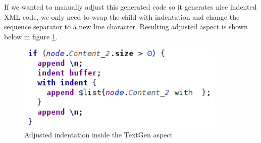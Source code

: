 If we wanted to manually adjust this generated code so it generates nice indented XML code, we only need to wrap the  child with indentation and change the sequence separator to a new line character. Resulting adjusted aspect is shown below in figure \ref{fig:textgen_adjusted}.

\begin{figure}[h]
	\centering
	\includegraphics[width=100mm]{../img/textgen_adjusted.png}
	\caption{Adjusted indentation inside the TextGen aspect}
	\label{fig:textgen_adjusted}
\end{figure}